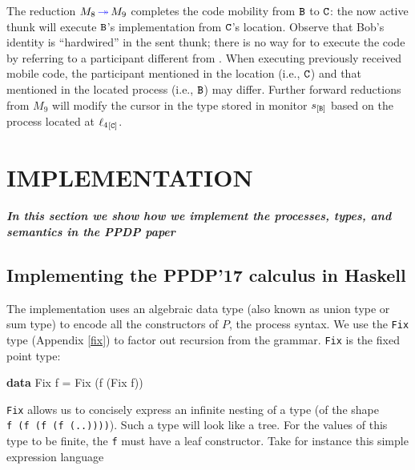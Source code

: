 \documentclass[runningheads,plain]{llncs}
\newcommand{\erase}[1]{\textcolor{orange}{#1}}
\newenvironment{Shaded}{}{}
\newcommand{\KeywordTok}[1]{\textcolor[rgb]{0.00,0.44,0.13}{\textbf{#1}}}
\newcommand{\DataTypeTok}[1]{\textcolor[rgb]{0.56,0.13,0.00}{#1}}
\newcommand{\FunctionTok}[1]{\textcolor[rgb]{0.02,0.16,0.49}{#1}}
\newcommand{\NormalTok}[1]{#1}
\begin{document}
The reduction $M_8 \textcolor{blue}{\,\twoheadrightarrow\,} M_9$ completes the code mobility from $\mathtt{B}$ to $\mathtt{C}$: the now active thunk
will execute $\mathtt{B}$'s implementation from $\mathtt{C}$'s location. Observe that Bob's identity \pB is ``hardwired'' in the sent thunk; 
there is no way for \pC to execute the code by referring to a participant different  from \pB.
When executing previously received mobile code, the participant mentioned in the location (i.e., $\mathtt{C}$)
and that mentioned in the located process (i.e., $\mathtt{B}$) may differ.
Further forward reductions from $M_9$ will  modify the cursor in the type stored in monitor $s_{[\mathtt{B}]}$
based on the process located at ${{\ell_4}}_{[\mathtt{C}]}$.



\section{IMPLEMENTATION}
\textbf{\emph{In this section we show how we implement the processes, types, and semantics in the PPDP paper}}

\subsection{Implementing the PPDP'17 calculus in
Haskell}\label{implementing-the-ppdp17-calculus-in-haskell}

The implementation uses an algebraic data type (also known as union type or sum type) to
encode all the constructors of $P$, the process syntax. We use the \texttt{Fix} type
(Appendix \ref{fix}) to factor out recursion from the grammar.
\texttt{Fix} is the fixed point type:

\begin{Shaded}
\begin{Highlighting}[]
\KeywordTok{data} \DataTypeTok{Fix}\NormalTok{ f }\FunctionTok{=} \DataTypeTok{Fix}\NormalTok{ (f (}\DataTypeTok{Fix}\NormalTok{ f))}
\end{Highlighting}
\end{Shaded}

\texttt{Fix} allows us to concisely express an infinite nesting of a
type (of the shape \texttt{f\ (f\ (f\ (f\ (..))))}). Such a type will
look like a tree. For the values of this type to be finite, the
\texttt{f} must have a leaf constructor. Take for instance this simple
expression language
\end{document}
